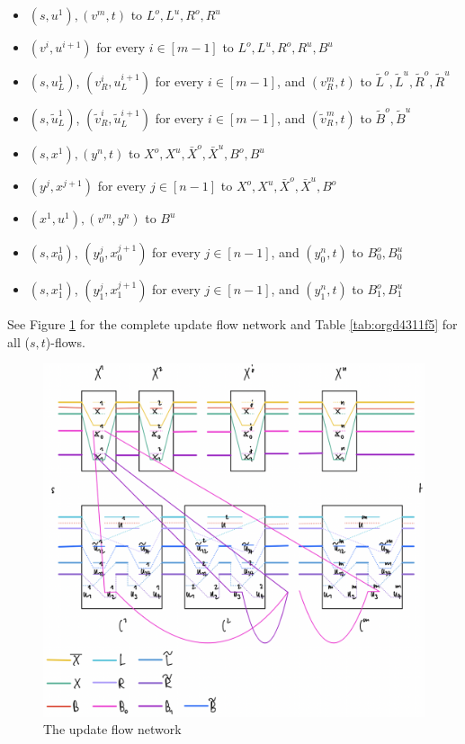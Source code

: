 \documentclass[fontsize=11pt,paper=a4]{book}
\begin{document}
\begin{itemize}
\item \((s,u^1),(v^m,t)\) to \(L^o,L^u,R^o,R^u\)
\item \((v^i,u^{i+1})\) for every \(i\in[m-1]\) to \(L^o,L^u,R^o,R^u,B^u\)
\item \((s,u_L^1)\), \((v_R^i,u_L^{i+1})\) for every \(i\in[m-1]\), and \((v_R^m,t)\) to \(\tilde{L}^o,\tilde{L}^u,\tilde{R}^o,\tilde{R}^u\)
\item \((s,\tilde{u}_L^1)\), \((\tilde{v}_R^i,\tilde{u}_L^{i+1})\) for every \(i\in[m-1]\), and \((\tilde{v}_R^m,t)\) to \(\tilde{B}^o,\tilde{B}^u\)
\item \((s,x^1),(y^n,t)\) to \(X^o,X^u,\bar{X}^o,\bar{X}^u,B^o,B^u\)
\item \((y^j,x^{j+1})\) for every \(j\in[n-1]\) to \(X^o,X^u,\bar{X}^o,\bar{X}^u,B^o\)
\item \((x^1,u^1),(v^m,y^n)\) to \(B^u\)
\item \((s,x_0^1)\), \((y_0^j,x_0^{j+1})\) for every \(j\in[n-1]\), and \((y_0^n,t)\) to \(B_0^o,B_0^u\)
\item \((s,x_1^1)\), \((y_1^j,x_1^{j+1})\) for every \(j\in[n-1]\), and \((y_1^n,t)\) to \(B_1^o,B_1^u\)
\end{itemize}

See Figure \ref{fig:org583fd38} for the complete update flow network and Table \ref{tab:orgd4311f5} for all (\(s,t\))-flows.

\begin{figure}[htbp]
\centering
\includegraphics[width=.9\linewidth]{../assets/Screen Shot 2023-02-14 at 15.08.01.png}
\caption{\label{fig:org583fd38}The update flow network}
\end{figure}
\end{document}
